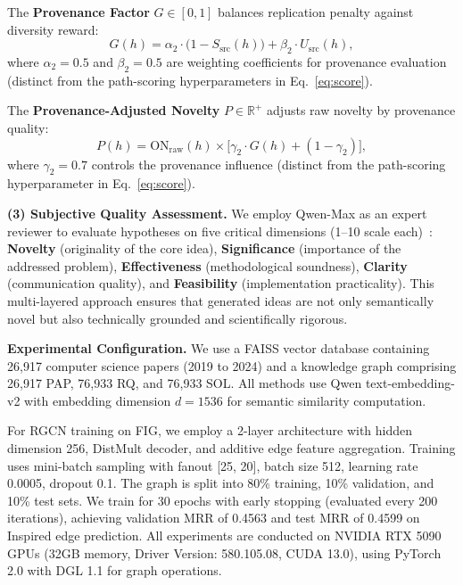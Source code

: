 \documentclass[runningheads]{llncs}
\begin{document}
The \textbf{Provenance Factor} $G \in [0, 1]$ balances replication penalty against diversity reward:
\begin{equation}
    G(h) = \alpha_2 \cdot \big(1 - S_{\text{src}}(h)\big) + \beta_2 \cdot U_{\text{src}}(h),
    \label{eq:provenance_factor}
\end{equation}
where $\alpha_2 = 0.5$ and $\beta_2 = 0.5$ are weighting coefficients for provenance evaluation (distinct from the path-scoring hyperparameters in Eq.~\ref{eq:score}).

The \textbf{Provenance-Adjusted Novelty} $P \in \mathbb{R}^+$ adjusts raw novelty by provenance quality:
\begin{equation}
   P(h) = \text{ON}_{\text{raw}}(h) \times \big[\gamma_2 \cdot G(h) + (1 - \gamma_2)\big],
   \label{eq:p_score}
\end{equation}
where $\gamma_2 = 0.7$ controls the provenance influence (distinct from the path-scoring hyperparameter in Eq.~\ref{eq:score}).

\textbf{(3) Subjective Quality Assessment.} We employ Qwen-Max as an expert reviewer to evaluate hypotheses on five critical dimensions (1--10 scale each)~\cite{gu2024llm,siyang2024novel}: \textbf{Novelty} (originality of the core idea), \textbf{Significance} (importance of the addressed problem), \textbf{Effectiveness} (methodological soundness), \textbf{Clarity} (communication quality), and \textbf{Feasibility} (implementation practicality). This multi-layered approach ensures that generated ideas are not only semantically novel but also technically grounded and scientifically rigorous.

\textbf{Experimental Configuration.} We use a FAISS vector database containing 26,917 computer science papers (2019 to 2024) and a knowledge graph comprising 26,917 PAP, 76,933 RQ, and 76,933 SOL. All methods use Qwen text-embedding-v2 with embedding dimension $d=1536$ for semantic similarity computation.

For RGCN training on FIG, we employ a 2-layer architecture with hidden dimension 256, DistMult decoder, and additive edge feature aggregation. Training uses mini-batch sampling with fanout [25, 20], batch size 512, learning rate 0.0005, dropout 0.1. The graph is split into 80\% training, 10\% validation, and 10\% test sets. We train for 30 epochs with early stopping (evaluated every 200 iterations), achieving validation MRR of 0.4563 and test MRR of 0.4599 on Inspired edge prediction. All experiments are conducted on NVIDIA RTX 5090 GPUs (32GB memory, Driver Version: 580.105.08, CUDA 13.0), using PyTorch 2.0 with DGL 1.1 for graph operations.
\end{document}
